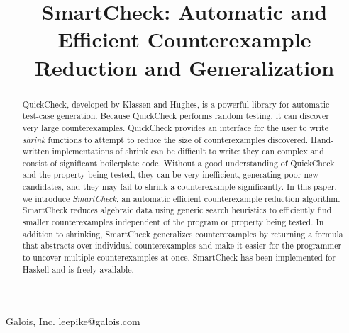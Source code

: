 \documentclass{sigplanconf}
\begin{document}


\title{SmartCheck: Automatic and Efficient Counterexample Reduction and Generalization}

           {Galois, Inc.}
           {leepike@galois.com}
\maketitle

\begin{abstract}
QuickCheck, developed by Klassen and Hughes, is a powerful library for automatic
test-case generation.  Because QuickCheck performs random testing, it can
discover very large counterexamples.  QuickCheck provides an interface for the
user to write \emph{shrink} functions to attempt to reduce the size of
counterexamples discovered.  Hand-written implementations of shrink can be
difficult to write: they can complex and consist of significant boilerplate
code.  Without a good understanding of QuickCheck and the property being tested,
they can be very inefficient, generating poor new candidates, and they may fail
to shrink a counterexample significantly.  In this paper, we introduce
\emph{SmartCheck}, an automatic efficient counterexample reduction algorithm.
SmartCheck reduces algebraic data using generic search heuristics to efficiently
find smaller counterexamples independent of the program or property being
tested.  In addition to shrinking, SmartCheck generalizes counterexamples by
returning a formula that abstracts over individual counterexamples and make it
easier for the programmer to uncover multiple counterexamples at once.
SmartCheck has been implemented for Haskell and is freely available.
\end{abstract}




\end{document}
